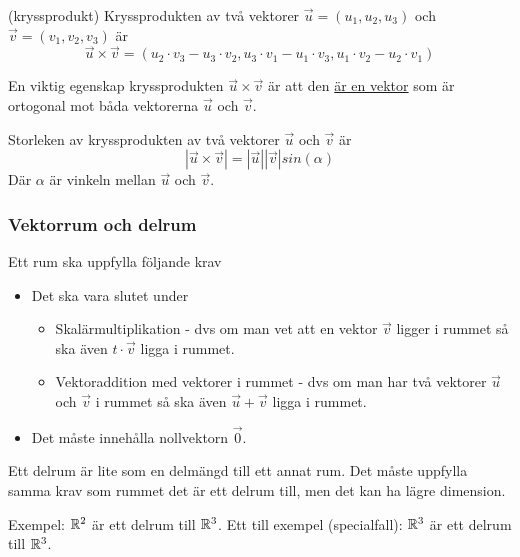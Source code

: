 \documentclass[../main.tex]{subfiles}
\begin{document}
\begin{formel}{(kryssprodukt)}
\label{kryssprod} 
Kryssprodukten av två vektorer $\vec{u} = (u_1, u_2, u_3)$ och $\vec{v} = (v_1, v_2, v_3)$ är
\[\vec{u}\times \vec{v} = (u_2\cdot v_3 - u_3\cdot v_2, u_3\cdot v_1 - u_1\cdot v_3, u_1\cdot v_2 - u_2\cdot v_1)\]

En viktig egenskap kryssprodukten $\vec{u}\times\vec{v}$ är att den \underline{är en vektor} som är ortogonal mot båda vektorerna $\vec{u}$ och $\vec{v}$.
\end{formel}


\begin{formel}
\label{kryssprodsize} 
Storleken av kryssprodukten av två vektorer $\vec{u}$ och $\vec{v}$ är
\[|\vec{u}\times \vec{v}| = |\vec{u}||\vec{v}|sin(\alpha)\]
Där $\alpha$ är vinkeln mellan $\vec{u}$ och $\vec{v}$.
\end{formel}

\subsubsection{Vektorrum och delrum}
\label{vektorrum}
Ett rum ska uppfylla följande krav
\begin{itemize}
    \item Det ska vara slutet under
    \begin{itemize}
        \item Skalärmultiplikation - dvs om man vet att en vektor $\vec{v}$ ligger i rummet så ska även $t\cdot\vec{v}$ ligga i rummet.
        \item Vektoraddition med vektorer i rummet - dvs om man har två vektorer $\vec{u}$ och $\vec{v}$ i rummet så ska även $\vec{u}+\vec{v}$ ligga i rummet.
    \end{itemize}
    \item Det måste innehålla nollvektorn $\vec{0}$.
\end{itemize}

Ett delrum är lite som en delmängd till ett annat rum. Det måste uppfylla samma krav som rummet det är ett delrum till, men det kan ha lägre dimension. 

Exempel: $\mathbb{R}^{2}$ är ett delrum till $\mathbb{R}^{3}$. Ett till exempel (specialfall): $\mathbb{R}^{3}$ är ett delrum till $\mathbb{R}^{3}$.
\end{document}
